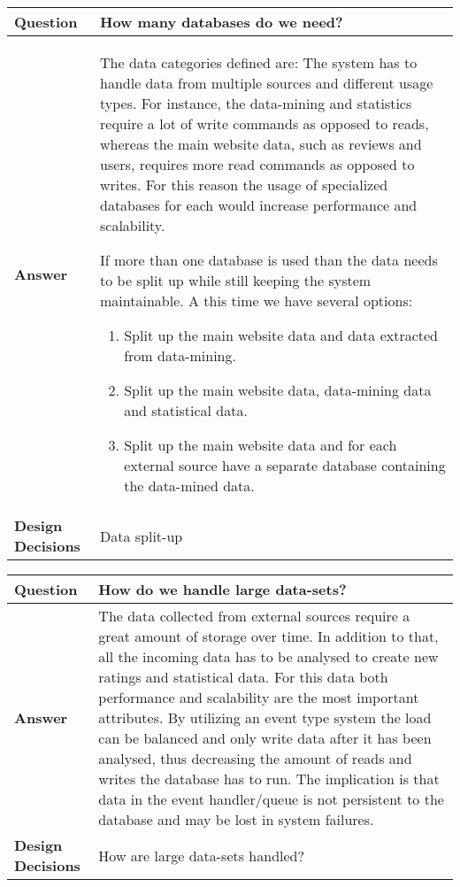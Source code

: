 \begin{longtable}{| l |  p{12cm} |}
\hline
\textbf{Question} & \textbf{How many databases do we need?}  \\ \hline
\textbf{Answer} &
The data categories defined are:
The system has to handle data from multiple sources and different usage types. For instance, the data-mining and statistics require a lot of write commands as opposed to reads, whereas the main website data, such as reviews and users, requires more read commands as opposed to writes. For this reason the usage of specialized databases for each would increase performance and scalability.

If more than one database is used than  the data needs to be split up while still keeping the system maintainable. 
A this time we have several options:
\begin{enumerate}
\item Split up the main website data and data extracted from data-mining.
\item Split up the main website data, data-mining data and statistical data.
\item Split up the main website data and for each external source have a separate database containing the data-mined data.
\end{enumerate}
  \\ \hline
\textbf{Design Decisions} & Data split-up  \\ \hline
\end{longtable}

\begin{longtable}{| l |  p{12cm} |}
\hline
\textbf{Question} & \textbf{How do we handle large data-sets?}  \\ \hline
\textbf{Answer} &
The data collected from external sources require a great amount of storage over time. In addition to that, all the incoming data has to be analysed to create new ratings and statistical data. For this data both performance and scalability are the most important attributes.
By utilizing an event type system the load can be balanced and only write data after it has been analysed, thus decreasing the amount of reads and writes the database has to run. The implication is that data in the event handler/queue is not persistent to the database and may be lost in system failures.
  \\ \hline
\textbf{Design Decisions} & How are large data-sets handled?  \\ \hline
\end{longtable}


